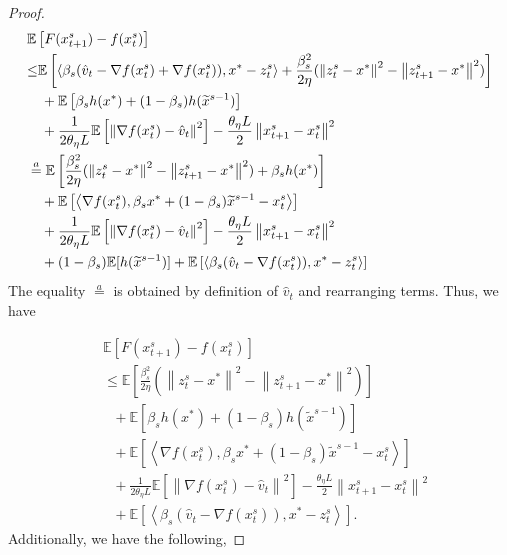 \documentclass{article}
\newcommand*{\E}{\mathbb{E}}
\newcommand{\norm}[1]{\left\lVert#1\right\rVert}
\newcommand{\Iprod}[2]{\left\langle #1,#2\right\rangle}
\theoremstyle{definition}
\theoremstyle{remark}
\begin{document}
{\begin{proof}
\begin{gather}\label{Eq3-Lemma1I}
\begin{split}
&\E\left[F(x_{t+1}^s) -f(x_{t}^s)\right]\\
&{\leq}\E\left[\Iprod{\beta_s(\hat{v}_{t}-\nabla f(x_{t}^s)+\nabla f(x_{t}^s))}{x^* - z_{t}^s}+{\frac{\beta_s^2}{2\eta}}(\norm{z_{t}^s-x^*}^2-\norm{z_{t+1}^s-x^*}^2)\right]\\
&~~~+\E\left[\beta_s h(x^*)+(1-\beta_s) h(\widetilde{x}^{s-1})\right]\\
&~~~+\frac{1}{2\theta_{\eta} L}\E\left[\norm{\nabla f(x_{t}^s)-\hat{v}_{t}}^2\right]-\frac{\theta_{\eta} L}{2}\norm{x_{t+1}^s-x_{t}^s}^2\\
& \stackrel{a}{=} \E\left[{\frac{ \beta_s^2}{2\eta}}(\norm{z_{t}^s-x^*}^2-\norm{z_{t+1}^s-x^*}^2)+\beta_sh(x^*)\right]\\
&~~~+\E\left[\Iprod{\nabla f(x_{t}^s)}{\beta_sx^*+(1-\beta_s)\widetilde{x}^{s-1}-{x}^{s}_{t}}\right]\\
&~~~+\frac{1}{2\theta_{\eta} L}\E\left[\norm{\nabla f(x_{t}^s)-\hat{v}_{t}}^2\right]-\frac{\theta_{\eta} L}{2}\norm{x_{t+1}^s-x_{t}^s}^2\\
&~~~+(1-\beta_s) \E[h(\widetilde{x}^{s-1})]+\E\left[\Iprod{\beta_s(\hat{v}_{t}-\nabla f(x_{t}^s))}{x^* - z_{t}^s}\right]
\end{split}
\raisetag{18pt}
\end{gather}
The equality $\stackrel{a}{=}$ is obtained by definition of $\hat{v}_{t}$ and rearranging terms. Thus, we have

\begin{equation}\label{Eq3-Lemma1}
\begin{split}
&\E\left[F(x_{t+1}^s) -f(x_{t}^s)\right]\\
&\leq\E\left[{\frac{ \beta_s^2}{2\eta}}(\norm{z_{t}^s-x^*}^2-\norm{z_{t+1}^s-x^*}^2)\right]\\
&~~~+\E\left[\beta_sh(x^*)+(1-\beta_s) h(\widetilde{x}^{s-1})\right]\\
&~~~+\E\left[\Iprod{\nabla f(x_{t}^s)}{\beta_sx^*+(1-\beta_s)\widetilde{x}^{s-1}-{x}^{s}_{t}}\right]\\
&~~~+\frac{1}{2\theta_{\eta} L}\E\left[\norm{\nabla f(x_{t}^s)-\hat{v}_{t}}^2\right]-\frac{\theta_{\eta} L}{2}\norm{x_{t+1}^s-x_{t}^s}^2\\
&~~~+\E\left[\Iprod{\beta_s(\hat{v}_{t}-\nabla f(x_{t}^s))}{x^* - z_{t}^s}\right].
\end{split}
\end{equation}
Additionally, we have the following,


\end{proof}}
\end{document}
